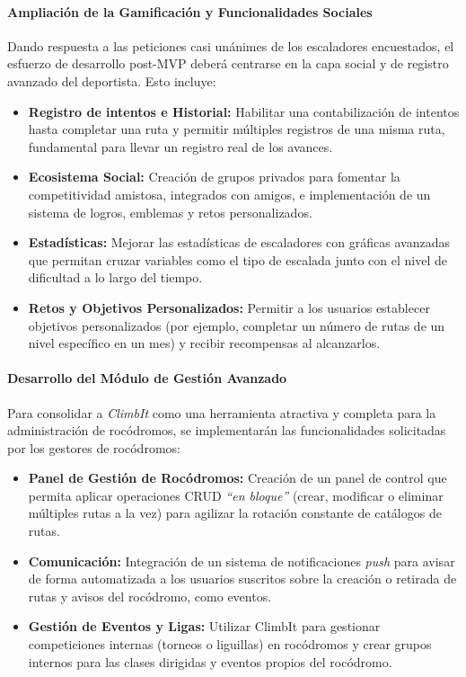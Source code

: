 \paragraph{Ampliación de la Gamificación y Funcionalidades Sociales}
Dando respuesta a las peticiones casi unánimes de los escaladores encuestados, el esfuerzo de desarrollo post-MVP deberá centrarse en la capa social y de registro avanzado del deportista. Esto incluye:
\begin{itemize}
    \item \textbf{Registro de intentos e Historial:} Habilitar una contabilización de intentos hasta completar una ruta y permitir múltiples registros de una misma ruta, fundamental para llevar un registro real de los avances.
    \item \textbf{Ecosistema Social:} Creación de grupos privados para fomentar la competitividad amistosa, integrados con amigos, e implementación de un sistema de logros, emblemas y retos personalizados.
    \item \textbf{Estadísticas:} Mejorar las estadísticas de escaladores con gráficas avanzadas que permitan cruzar variables como el tipo de escalada junto con el nivel de dificultad a lo largo del tiempo.
    \item \textbf{Retos y Objetivos Personalizados:} Permitir a los usuarios establecer objetivos personalizados (por ejemplo, completar un número de rutas de un nivel específico en un mes) y recibir recompensas al alcanzarlos.
\end{itemize}

\paragraph{Desarrollo del Módulo de Gestión Avanzado}
Para consolidar a \textit{ClimbIt} como una herramienta atractiva y completa para la administración de rocódromos, se implementarán las funcionalidades solicitadas por los gestores de rocódromos:
\begin{itemize}
    \item \textbf{Panel de Gestión de Rocódromos:} Creación de un panel de control que permita aplicar operaciones CRUD \textit{``en bloque''} (crear, modificar o eliminar múltiples rutas a la vez) para agilizar la rotación constante de catálogos de rutas.
    \item \textbf{Comunicación:} Integración de un sistema de notificaciones \textit{push} para avisar de forma automatizada a los usuarios suscritos sobre la creación o retirada de rutas y avisos del rocódromo, como eventos.
    \item \textbf{Gestión de Eventos y Ligas:} Utilizar ClimbIt para gestionar competiciones internas (torneos o liguillas) en rocódromos y crear grupos internos para las clases dirigidas y eventos propios del rocódromo.
\end{itemize}

